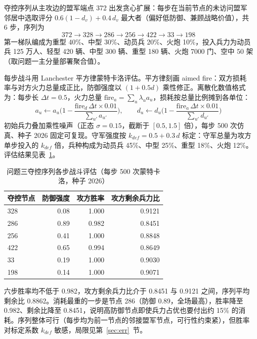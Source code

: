 \documentclass[12pt,a4paper]{ctexart}
\begin{document}
夺控序列从主攻边的盟军端点 372 出发贪心扩展：每步在当前节点的未访问盟军邻居中选取评分 $0.6(1-d_v)+0.4\,d_v$ 最大者（偏好低防御、兼顾战略价值），共 6 步，序列为
\begin{equation}
372\to 328\to 286\to 256\to 422\to 33\to 198
\label{eq:seq}
\end{equation}
第一梯队编成为重型 40\%、中型 30\%、动员兵 20\%、火炮 10\%，投入兵力为动员兵 125 万人、轻型 420 辆、中型 300 辆、重型 180 辆、火炮 7000 门、空中 50 架（取问题一主分量部署聚合值）。

每步战斗用 Lanchester 平方律蒙特卡洛评估\cite{ref8,ref12}。平方律刻画 aimed fire：双方损耗率与对方火力总量成正比，防御强度以 $(1+0.5d)$ 乘性修正。离散化数值格式为：每步长 $\Delta t=0.5$，火力总量 $\mathrm{fire}_a=\sum_u\lambda_u a_u$，损耗按总量比例摊到各单位：
\begin{equation}
a_u\leftarrow a_u\Big(1-\frac{\mathrm{fire}_d\,\Delta t\times 0.01}{\sum_{u'}a_{u'}}\Big),\qquad d_u\leftarrow d_u\Big(1-\frac{\mathrm{fire}_a\,\Delta t\times 0.01}{\sum_{u'}d_{u'}}\Big)
\label{eq:lanchester}
\end{equation}
初始兵力叠加乘性噪声（正态 $\sigma=0.15$，截断于 $[0.5,1.5]$ 倍），每步 500 次仿真、种子 2026 固定可复现。守军强度按 $k_{def}=0.5+0.3\,d$ 标定：守军总量为攻方单步投入的 $k_{def}$ 倍，兵种构成为动员兵 45\%、中型 25\%、重型 18\%、火炮 12\%。评估结果见表~\ref{tab:capture}。

\begin{table}[H]
\centering
\caption{问题三夺控序列各步战斗评估（每步 500 次蒙特卡洛，种子 2026）}
\label{tab:capture}
\begin{tabular}{lrrr}
\toprule
夺控节点 & 防御强度 & 攻方胜率 & 攻方剩余兵力比 \\
\midrule
328 & 0.08 & 1.000 & 0.9121 \\
286 & 0.89 & 0.982 & 0.8451 \\
256 & 0.41 & 1.000 & 0.8848 \\
422 & 0.65 & 0.994 & 0.8649 \\
33 & 0.19 & 1.000 & 0.9030 \\
198 & 0.14 & 1.000 & 0.9071 \\
\bottomrule
\end{tabular}
\end{table}

六步胜率均不低于 0.982，攻方剩余兵力比介于 0.8451 与 0.9121 之间，序列平均剩余比 0.8862。消耗最重的一步是节点 286（防御 0.89，全场最高），胜率降至 0.982、剩余比降至 0.8451，说明高防御节点即使兵力占优也要付出约 15\% 的消耗。序列整体可行（每步均为前一节点的邻接盟军节点，可行性约束紧），但胜率对标定系数 $k_{def}$ 敏感，局限见第~\ref{sec:err}~节。
\end{document}
